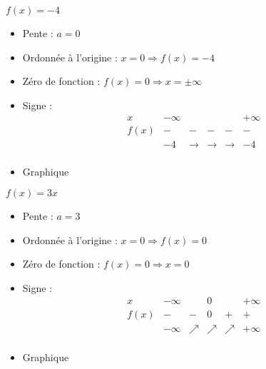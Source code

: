 \begin{solution}
$f(x)=-4$
\begin{itemize}
\item Pente :	$a=0$
\item Ordonnée à l’origine :	$x=0\Rightarrow f(x)=-4$
\item Zéro de fonction :	$f(x)=0\Rightarrow x=\pm \infty $
\item Signe :	$$\begin{array}{l|l|l|l|l|l}
x    & -\infty &   & &   & +\infty \\
\hline
f(x) & -       & - & -  & - & -   \\
 & -4 & \rightarrow & \rightarrow & \rightarrow & -4 \\   
\end{array}$$
\item Graphique
\end{itemize}
\end{solution}

\begin{solution}
$f(x)=3x$
\begin{itemize}
\item Pente :	$a=3$
\item Ordonnée à l’origine :	$x=0\Rightarrow f(x)=0$ 
\item Zéro de fonction :	$f(x)=0\Rightarrow x=0$
\item Signe :	$$\begin{array}{l|l|l|l|l|l}
x    & -\infty &   & 0 &   & +\infty \\
\hline
f(x) & -       & - & 0  & + & +   \\
 & -\infty & \nearrow & \nearrow & \nearrow & +\infty \\   
\end{array}$$
\item Graphique
\end{itemize}
\end{solution}

